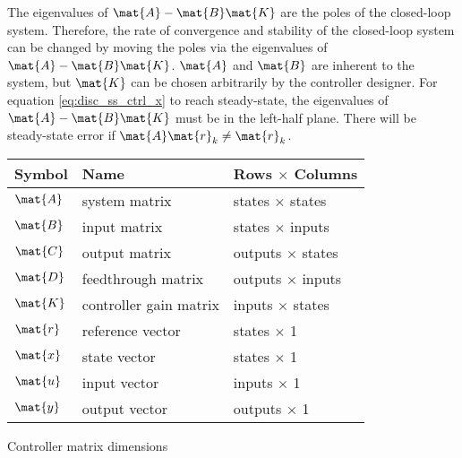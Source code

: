 The eigenvalues of $\mat{A} - \mat{B}\mat{K}$ are the poles of the closed-loop
\gls{system}. Therefore, the rate of convergence and stability of the
closed-loop \gls{system} can be changed by moving the poles via the eigenvalues
of $\mat{A} - \mat{B}\mat{K}$. $\mat{A}$ and $\mat{B}$ are inherent to the
\gls{system}, but $\mat{K}$ can be chosen arbitrarily by the controller
designer. For equation \eqref{eq:disc_ss_ctrl_x} to reach steady-state, the
eigenvalues of $\mat{A} - \mat{B}\mat{K}$ must be in the left-half plane. There
will be steady-state error if $\mat{A}\mat{r}_k \ne \mat{r}_k$.
\begin{booktable}
  \begin{tabular}{|lll|}
    \hline
    \rowcolor{headingbg}
    \textbf{Symbol} & \textbf{Name} & \textbf{Rows $\times$ Columns} \\
    \hline
    $\mat{A}$ & system matrix & states $\times$ states \\
    $\mat{B}$ & input matrix & states $\times$ inputs \\
    $\mat{C}$ & output matrix & outputs $\times$ states \\
    $\mat{D}$ & feedthrough matrix & outputs $\times$ inputs \\
    $\mat{K}$ & controller gain matrix & inputs $\times$ states \\
    $\mat{r}$ & \gls{reference} vector & states $\times$ 1 \\
    $\mat{x}$ & state vector & states $\times$ 1 \\
    $\mat{u}$ & input vector & inputs $\times$ 1 \\
    $\mat{y}$ & output vector & outputs $\times$ 1 \\
    \hline
  \end{tabular}
  \caption{Controller matrix dimensions}
\end{booktable}
